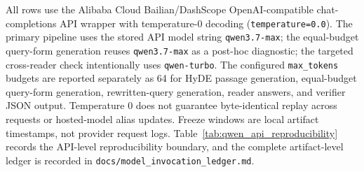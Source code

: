 \begin{table}[t]
\begin{threeparttable}
\begin{tablenotes}
\footnotesize
\item All rows use the Alibaba Cloud Bailian/DashScope OpenAI-compatible chat-completions API wrapper with temperature-0 decoding (\texttt{temperature=0.0}). The primary pipeline uses the stored API model string \texttt{qwen3.7-max}; the equal-budget query-form generation reuses \texttt{qwen3.7-max} as a post-hoc diagnostic; the targeted cross-reader check intentionally uses \texttt{qwen-turbo}. The configured \texttt{max\_tokens} budgets are reported separately as 64 for HyDE passage generation, equal-budget query-form generation, rewritten-query generation, reader answers, and verifier JSON output. Temperature 0 does not guarantee byte-identical replay across requests or hosted-model alias updates. Freeze windows are local artifact timestamps, not provider request logs. Table~\ref{tab:qwen_api_reproducibility} records the API-level reproducibility boundary, and the complete artifact-level ledger is recorded in \texttt{docs/model\_invocation\_ledger.md}.
\end{tablenotes}
\end{threeparttable}
\end{table}
